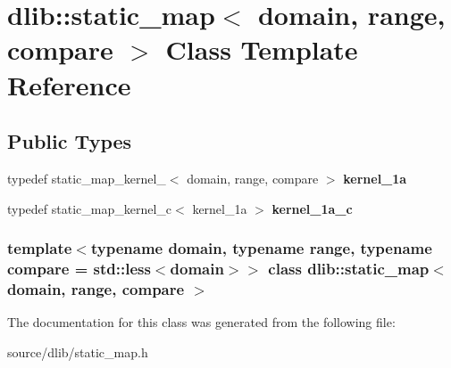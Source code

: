 \hypertarget{classdlib_1_1static__map}{
\section{dlib::static\_\-map$<$ domain, range, compare $>$ Class Template Reference}
\label{classdlib_1_1static__map}
}
\subsection*{Public Types}
\begin{DoxyCompactItemize}
\item 
\hypertarget{classdlib_1_1static__map_a8d7cc6df80ef7a0476d9dfa215be09bf}{
typedef static\_\-map\_\-kernel\_$<$ domain, range, compare $>$ {\bfseries kernel\_\-1a}}
\label{classdlib_1_1static__map_a8d7cc6df80ef7a0476d9dfa215be09bf}

\item 
\hypertarget{classdlib_1_1static__map_a5681645ffc274e02120720c00fded24b}{
typedef static\_\-map\_\-kernel\_\-c$<$ kernel\_\-1a $>$ {\bfseries kernel\_\-1a\_\-c}}
\label{classdlib_1_1static__map_a5681645ffc274e02120720c00fded24b}

\end{DoxyCompactItemize}
\subsubsection*{template$<$typename domain, typename range, typename compare = std::less$<$domain$>$$>$ class dlib::static\_\-map$<$ domain, range, compare $>$}



The documentation for this class was generated from the following file:\begin{DoxyCompactItemize}
\item 
source/dlib/static\_\-map.h\end{DoxyCompactItemize}
